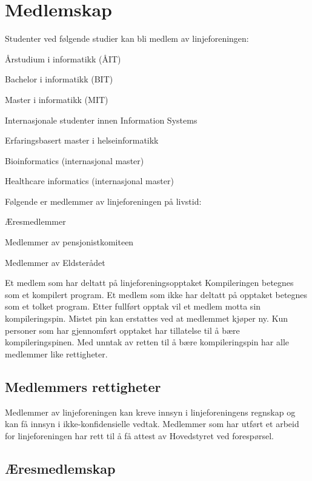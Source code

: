 \chapter{Medlemskap}
\label{chap:medlemskap}
Studenter ved følgende studier kan bli medlem av linjeforeningen: 
\begin{liste}
	\item Årstudium i informatikk (ÅIT)
	\item Bachelor i informatikk (BIT)
	\item Master i informatikk (MIT)
	\item Internasjonale studenter innen Information Systems
	\item Erfaringsbasert master i helseinformatikk		%
	\item Bioinformatics (internasjonal master)		%
	\item Healthcare informatics (internasjonal master)	%
\end{liste} 
Følgende er medlemmer av linjeforeningen på livstid:
\begin{liste}
	\item Æresmedlemmer
	\item Medlemmer av pensjonistkomiteen
	\item Medlemmer av Eldsterådet
\end{liste}

Et medlem som har deltatt på linjeforeningsopptaket Kompileringen betegnes som et kompilert program. Et medlem som ikke har deltatt på opptaket betegnes som et tolket program. Etter fullført opptak vil et medlem motta sin kompileringspin. Mistet pin kan erstattes ved at medlemmet kjøper ny. Kun personer som har gjennomført opptaket har tillatelse til å bære kompileringspinen. Med unntak av retten til å bære kompileringspin har alle medlemmer like rettigheter. %

\section{Medlemmers rettigheter}

Medlemmer av linjeforeningen kan kreve innsyn i linjeforeningens regnskap og kan få innsyn i ikke-konfidensielle vedtak. Medlemmer som har utført et arbeid for linjeforeningen har rett til å få attest av Hovedstyret ved forespørsel.

\section{Æresmedlemskap}

